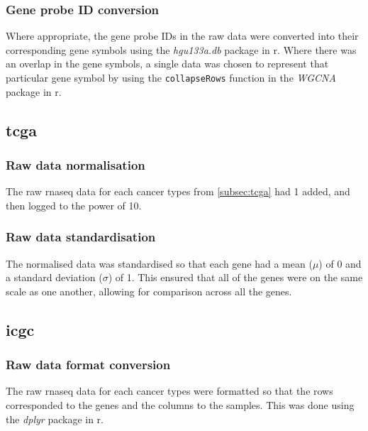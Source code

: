\subsubsection{\textbf{Gene probe ID conversion}}

Where appropriate, the gene probe IDs in the raw data were converted into their corresponding gene symbols using the \textit{hgu133a.db} package in \gls{r}.
Where there was an overlap in the gene symbols, a single data was chosen to represent that particular gene symbol by using the \texttt{collapseRows} function in the \textit{WGCNA} package in \gls{r}.

\subsection{\gls{tcga}}
\label{subsec:datproctcga}

\subsubsection{\textbf{Raw data normalisation}}

The raw \gls{rnaseq} data for each cancer types from \cref{subsec:tcga} had 1 added, and then logged to the power of 10.

\subsubsection{\textbf{Raw data standardisation}}

The normalised data was standardised so that each gene had a mean ($\mu$) of 0 and a standard deviation ($\sigma$) of 1.
This ensured that all of the genes were on the same scale as one another, allowing for comparison across all the genes.

\subsection{\gls{icgc}}
\label{subsec:datprocicgc}

\subsubsection{\textbf{Raw data format conversion}}
The raw \gls{rnaseq} data for each cancer types were formatted so that the rows corresponded to the genes and the columns to the samples.
This was done using the \textit{dplyr} package in \gls{r}.

